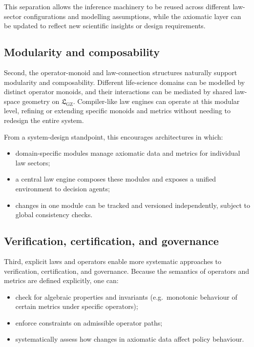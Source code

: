 \documentclass[11pt]{book}
\theoremstyle{plain}
\theoremstyle{definition}
\theoremstyle{remark}
\newcommand{\GZLS}{\ensuremath{\mathfrak{L}_{\mathrm{GZ}}}}       \newcommand{\GZLT}{\ensuremath{M_{!w}}}                           \newcommand{\GZLOC}{\ensuremath{A_M}}                             \newcommand{\GZLCurv}{\ensuremath{\mathcal{F}_{\mathrm{law}}}}
\begin{document}
This separation allows the inference machinery to be reused across
different law-sector configurations and modelling assumptions, while
the axiomatic layer can be updated to reflect new scientific insights
or design requirements.

\subsection*{Modularity and composability}

Second, the operator-monoid and law-connection structures naturally
support modularity and composability. Different life-science domains
can be modelled by distinct operator monoids, and their interactions
can be mediated by shared law-space geometry on $\GZLS$. Compiler-like
law engines can operate at this modular level, refining or extending
specific monoids and metrics without needing to redesign the entire
system.

From a system-design standpoint, this encourages architectures in which:

\begin{itemize}
  \item domain-specific modules manage axiomatic data and metrics for
        individual law sectors;
  \item a central law engine composes these modules and exposes a
        unified environment to decision agents;
  \item changes in one module can be tracked and versioned
        independently, subject to global consistency checks.
\end{itemize}

\subsection*{Verification, certification, and governance}

Third, explicit laws and operators enable more systematic approaches
to verification, certification, and governance. Because the semantics
of operators and metrics are defined explicitly, one can:

\begin{itemize}
  \item check for algebraic properties and invariants (e.g.\ monotonic
        behaviour of certain metrics under specific operators);
  \item enforce constraints on admissible operator paths;
  \item systematically assess how changes in axiomatic data affect
        policy behaviour.
\end{itemize}
\end{document}
